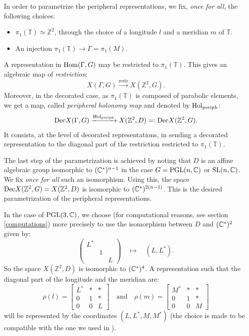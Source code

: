 In order to parametrize the peripheral representations, we fix, \emph{once for all}, the following choices: 
\begin{itemize}
\item $\pi_1(\mathbb T)\simeq \mathbb Z^2$, through the choice of a longitude $l$ and a meridian $m$ of $\mathbb T$.
\item An injection $\pi_1(\mathbb T)\to \Gamma=\pi_1(M)$.
\end{itemize}

A representation in $\mathrm{Hom}(\Gamma,G)$ may be restricted to $\pi_1(\mathbb T)$. This gives an algebraic map of \emph{restriction}:\newcommand{\restr}{\mathrm{restr}}
$$X(\Gamma,G)\xrightarrow{\restr}X(\mathbb Z^2,G).$$
Moreover, in the decorated case, as $\pi_1(\mathbb T)$ is composed of parabolic elements, we get a map, called \emph{peripheral holonomy map} and denoted by $\mathrm{Hol}_{\mathrm{periph}}$:
$$\mathrm{Dec}X(\Gamma,G)\xrightarrow{\mathrm{Hol}_{\mathrm{periph}}}X(\mathbb Z^2,D)=:\mathrm{Dec}X(\mathbb Z^2,G).$$
It consists, at the level of decorated representations, in sending a decorated representation to the diagonal part of the restriction restricted to $\pi_1(\mathbb T)$.

The last step of the parametrization is achieved by noting that $D$ is an affine algebraic group isomorphic to $(\mathbb{C}^*)^{n-1}$ in the case $G=\textrm{PGL}(n,\mathbb{C})$ or $\textrm{SL}(n,\mathbb{C})$. We fix \emph{once for all} such an isomorphism. Using this, the space $\mathrm{Dec}X(\mathbb Z^2,G)=X(\mathbb Z^2,D)$ is isomorphic to $(\mathbb{C}^*)^{2(n-1)}$. This is the desired parametrization of the peripheral representations.

 In the case of $\textrm{PGL}(3,\mathbb{C})$, we choose (for computational reasons, see section \ref{computations}) more precisely to use the isomorphism between $D$ and $(\mathbb{C}^*)^2$ given by:
$$\begin{pmatrix} L^*&&\\&1&\\&&L\end{pmatrix}\quad \mapsto\quad (L,L^*).$$
 So the space $X(\mathbb Z^2,D)$ is isomorphic to $(\mathbb{C}^*)^4$. A representation such that the diagonal part of the longitude and the meridian are:
 \[
\rho(l) = \left[ \begin{matrix}
  L^* & \ast & \ast\\
    0 & 1 & \ast\\
    0 & 0 & L
  \end{matrix} \right]\quad \textrm{and}\quad \rho(m) = \left[ \begin{matrix}
  M^* & \ast & \ast\\
    0 & 1 & \ast\\
    0 & 0 & M
  \end{matrix} \right]
 \]
will be represented by the coordinates $(L,L^*,M,M^*)$ (the choice is made to be compatible with the one 
we used in \cite{BFG}).



